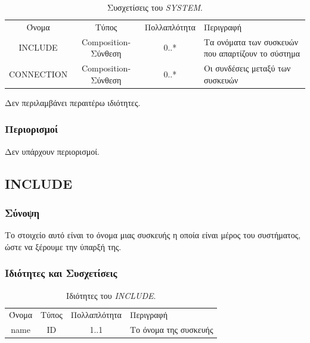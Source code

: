 \begin{table}[H]
	\begin{center}
		\begin{tabular}{ | c | c | c| m{5.5cm} | }
			\hline
			\rowcolor{Gray}
			\multicolumn{4}{|c|}{\textbf{Συσχετίσεις}}\\
			\hline
			\rowcolor{Gray}
			Όνομα & Τύπος & Πολλαπλότητα & Περιγραφή \\
			\hline
			INCLUDE & Composition-Σύνθεση & 0..* &  Τα ονόματα των συσκευών που απαρτίζουν το σύστημα \\
			\hline
			CONNECTION & Composition-Σύνθεση & 0..* &  Οι συνδέσεις μεταξύ των συσκευών \\
			\hline
		\end{tabular}
		\caption{Συσχετίσεις του \textit{SYSTEM}.}
		\label{tab:system}
	\end{center}
\end{table}

\noindent Δεν περιλαμβάνει περαιτέρω ιδιότητες.

\subsubsection*{Περιορισμοί}

\noindent Δεν υπάρχουν περιορισμοί.

\subsection{INCLUDE}
\label{subsec:include}

\subsubsection*{Σύνοψη}

\noindent Το στοιχείο αυτό είναι το όνομα μιας συσκευής η οποία είναι μέρος του συστήματος, ώστε να ξέρουμε την ύπαρξή της.

\subsubsection*{Ιδιότητες και Συσχετίσεις}

\begin{table}[H]
	\begin{center}
		\begin{tabular}{ | c | c | c| m{5.5cm} | }
			\hline
			\rowcolor{Gray}
			\multicolumn{4}{|c|}{\textbf{Ιδιότητες}}\\
			\hline
			\rowcolor{Gray}
			Όνομα & Τύπος & Πολλαπλότητα & Περιγραφή \\
			\hline
			name & ID & 1..1 &  Το όνομα της συσκευής \\
			\hline
		\end{tabular}
		\caption{Ιδιότητες του \textit{INCLUDE}.}
		\label{tab:include}
	\end{center}
\end{table}

